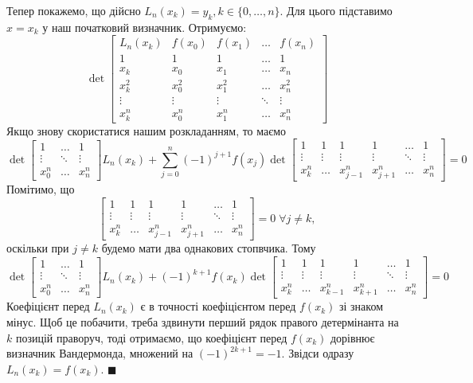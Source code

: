 \documentclass[14pt]{extarticle}
\begin{document}
Тепер покажемо, що дійсно $L_n(x_k)=y_k, k \in \{0,\dots,n\}$. Для цього підставимо $x=x_k$ у наш початковий визначник. Отримуємо:
\[
\det\begin{bmatrix}
    L_n(x_k) & f(x_0) & f(x_1) & \dots & f(x_n) \\
    1 & 1 & 1 & \dots & 1 \\
    x_k & x_0 & x_1 & \dots & x_n \\
    x_k^2 & x_0^2 & x_1^2 & \dots & x_n^2 \\
    \vdots & \vdots & \vdots & \ddots & \vdots \\
    x_k^n & x_0^n & x_1^n & \dots & x_n^n 
\end{bmatrix}
\]
Якщо знову скористатися нашим розкладанням, то маємо
\[
\det\begin{bmatrix}
    1 & \dots & 1 \\
    \vdots & \ddots & \vdots \\
    x_0^n & \dots & x_n^n
\end{bmatrix}L_n(x_k) + \sum_{j=0}^n (-1)^{j+1} f(x_j)\det\begin{bmatrix}
    1 & 1 & 1 & 1 & \dots & 1 \\
    \vdots & \vdots & \vdots & \vdots & \ddots & \vdots \\
    x_k^n & \dots & x_{j-1}^n & x_{j+1}^n & \dots & x_n^n
\end{bmatrix} = 0
\]
Помітимо, що 
\[
\begin{bmatrix}
    1 & 1 & 1 & 1 & \dots & 1 \\
    \vdots & \vdots & \vdots & \vdots & \ddots & \vdots \\
    x_k^n & \dots & x_{j-1}^n & x_{j+1}^n & \dots & x_n^n
\end{bmatrix} = 0 \; \forall j \neq k,
\]
оскільки при $j \neq k$ будемо мати два однакових стопвчика. Тому
\[
\det\begin{bmatrix}
    1 & \dots & 1 \\
    \vdots & \ddots & \vdots \\
    x_0^n & \dots & x_n^n
\end{bmatrix}L_n(x_k) + (-1)^{k+1}f(x_k)\det\begin{bmatrix}
    1 & 1 & 1 & 1 & \dots & 1 \\
    \vdots & \vdots & \vdots & \vdots & \ddots & \vdots \\
    x_k^n & \dots & x_{k-1}^n & x_{k+1}^n & \dots & x_n^n
\end{bmatrix} = 0
\]
Коефіцієнт перед $L_n(x_k)$ є в точності коефіцієнтом перед $f(x_k)$ зі знаком мінус. Щоб це побачити, треба здвинути перший рядок правого детермінанта на $k$ позицій праворуч, тоді отримаємо, що коефіцієнт перед $f(x_k)$ дорівнює визначник Вандермонда, множений на $(-1)^{2k+1}=-1$. Звідси одразу $L_n(x_k)=f(x_k)$. $\blacksquare$
\end{document}
